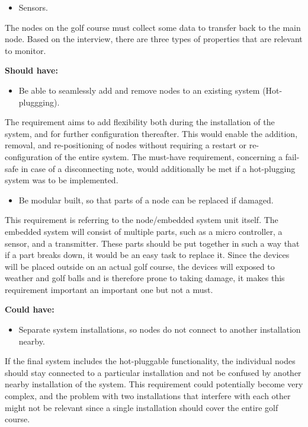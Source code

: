 \begin{itemize}
\item Sensors.
\end{itemize}
The nodes on the golf course must collect some data to transfer back to the main node. Based on the interview, there are three types of properties that are relevant to monitor.


\textbf{Should have:}
\begin{itemize}
\item Be able to seamlessly add and remove nodes to an existing system (Hot-pluggging).
\end{itemize}
The requirement aims to add flexibility both during the installation of the system, and for further configuration thereafter. This would enable the addition, removal, and re-positioning of nodes without requiring a restart or re-configuration of the entire system. The must-have requirement, concerning a fail-safe in case of a disconnecting note, would additionally be met if a hot-plugging system was to be implemented.


\begin{itemize}
\item Be modular built, so that parts of a node can be replaced if damaged.
\end{itemize}
This requirement is referring to the node/embedded system unit itself. The embedded system will consist of multiple parts, such as a micro controller, a sensor, and a transmitter. These parts should be put together in such a way that if a part breaks down, it would be an easy task to replace it. Since the devices will be placed outside on an actual golf course, the devices will exposed to weather and golf balls and is therefore prone to taking damage, it makes this requirement important an important one but not a must.


\textbf{Could have:}
\begin{itemize}
\item Separate system installations, so nodes do not connect to another installation nearby.
\end{itemize}
If the final system includes the hot-pluggable functionality, the individual nodes should stay connected to a particular installation and not be confused by another nearby installation of the system. This requirement could potentially become very complex, and the problem with two installations that interfere with each other might not be relevant since a single installation should cover the entire golf course.

